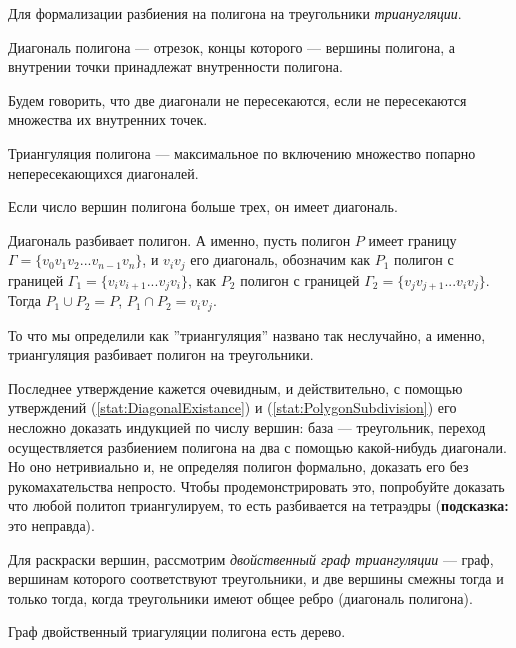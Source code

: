 Для формализации разбиения на полигона на треугольники \textit{трианугляции}.
\begin{definition}
    Диагональ полигона --- отрезок, концы которого --- вершины полигона, а внутрении точки принадлежат внутренности полигона. 
\end{definition}
Будем говорить, что две диагонали не пересекаются, если не пересекаются множества их внутренних точек.
\begin{definition}
    Триангуляция полигона --- максимальное по включению множество попарно непересекающихся диагоналей.
\end{definition}
\begin{statement}
    \label{stat:DiagonalExistance}
    Если число вершин полигона больше трех, он имеет диагональ.
\end{statement}
\begin{statement}
    \label{stat:PolygonSubdivision}
    Диагональ разбивает полигон. А именно, пусть полигон $P$ имеет границу $\Gamma = \{v_0 v_1 v_2 ... v_{n-1} v_n \}$, 
    и $v_i v_j$ его диагональ, обозначим как $P_1$ полигон с границей $\Gamma_1 = \{v_i v_{i+1} ... v_j v_i \}$, 
    как $P_2$ полигон с границей $\Gamma_2 = \{v_j v_{j+1} ... v_i v_j \}$. Тогда $P_1 \cup P_2 = P$, $P_1 \cap P_2 = v_i v_j$.
\end{statement}
\begin{statement}
    То что мы определили как ''триангуляция'' названо так неслучайно, а именно, триангуляция разбивает полигон на треугольники.
\end{statement}
Последнее утверждение кажется очевидным, и действительно, с помощью утверждений (\ref{stat:DiagonalExistance}) и 
(\ref{stat:PolygonSubdivision}) его несложно доказать индукцией по числу вершин: база --- треугольник, 
переход осуществляется разбиением полигона на два с помощью какой-нибудь диагонали.
Но оно нетривиально и, не определяя полигон формально, доказать его без рукомахательства непросто. Чтобы продемонстрировать это,
попробуйте доказать что любой политоп триангулируем, то есть разбивается на тетраэдры (\textbf{подсказка: } это неправда).

Для раскраски вершин, рассмотрим \textit{двойственный граф триангуляции} --- граф, вершинам которого соответствуют треугольники, 
и две вершины смежны тогда и только тогда, когда треугольники имеют общее ребро (диагональ полигона).

\begin{statement}
  Граф двойственный триагуляции полигона есть дерево.
\end{statement}

